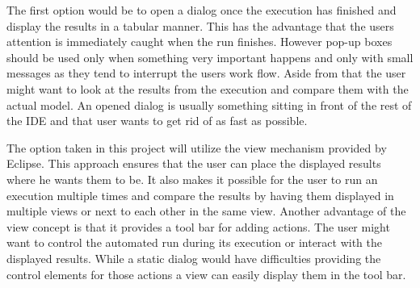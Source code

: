 The first option would be to open a dialog once the execution has finished
and display the results in a tabular manner. This has the advantage that the
users attention is immediately caught when the run finishes. However pop-up boxes
should be used only when something very important happens and only with small messages
as they tend to interrupt the users work flow. Aside from that the user might want
to look at the results from the execution and compare them with the actual model.
An opened dialog is usually something sitting in front of the rest of the \ac{IDE}
and that user wants to get rid of as fast as possible.

The option taken in this project will utilize the view mechanism provided by Eclipse.
This approach ensures that the user can place the displayed results where he wants them to be.
It also makes it possible for the user to run an execution multiple times and compare the
results by having them displayed in multiple views or next to each other in the same view.
Another advantage of the view concept is that it provides a tool bar for adding actions.
The user might want to control the automated run during its execution or interact with
the displayed results. While a static dialog would have difficulties providing the control elements
for those actions a view can easily display them in the tool bar.
